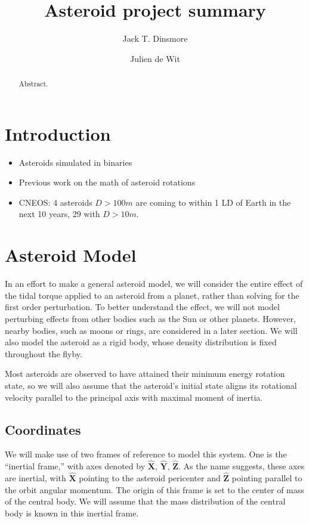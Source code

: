 \documentclass{aastex631}
\newcommand{\unit}[1]{\hat{\bm{#1}}}
\begin{document}
\title{Asteroid project summary}


\author[0000-0002-6401-778X]{Jack T. Dinsmore}

\author{Julien de Wit}

\begin{abstract}

Abstract. 
\end{abstract}




\section{Introduction}

\begin{itemize}
\item Asteroids simulated in binaries \cite{Naidu_2015}
\item Previous work on the math of asteroid rotations \cite{ashenberg07, paul88}
\item CNEOS: 4 asteroids $D > 100 m$ are coming to within 1 LD of Earth in the next 10 years, 29 with $D > 10 m$.
\end{itemize}


\section{Asteroid Model}
In an effort to make a general asteroid model, we will consider the entire effect of the tidal torque applied to an asteroid from a planet, rather than solving for the first order perturbation. To better understand the effect, we will not model perturbing effects from other bodies such as the Sun or other planets. However, nearby bodies, such as moons or rings, are considered in a later section. We will also model the asteroid as a rigid body, whose density distribution is fixed throughout the flyby.

Most asteroids are observed to have attained their minimum energy rotation state, so we will also assume that the asteroid's initial state aligns its rotational velocity parallel to the principal axis with maximal moment of inertia.

\subsection{Coordinates}
\label{sec:coordinates}
We will make use of two frames of reference to model this system. One is the ``inertial frame,'' with axes denoted by $\unit{X}$, $\unit{Y}$, $\unit{Z}$. As the name suggests, these axes are inertial, with $\unit{X}$ pointing to the asteroid pericenter and $\unit{Z}$ pointing parallel to the orbit angular momentum. The origin of this frame is set to the center of mass of the central body. We will assume that the mass distribution of the central body is known in this inertial frame.
\end{document}
